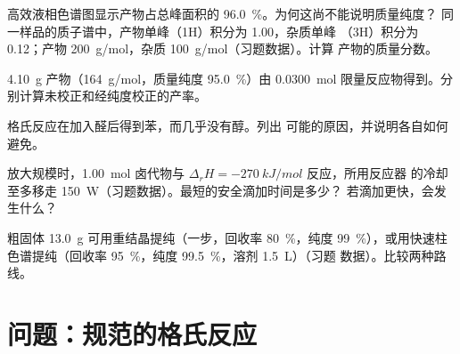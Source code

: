 \begin{exercise}[$\star\star$]\label{exo:b2:lab-techniques-2:8}
高效液相色谱图显示产物占总峰面积的 96.0~\%。为何这尚不能说明质量纯度？
同一样品的质子谱中，产物单峰（1H）积分为 1.00，杂质单峰
（3H）积分为 0.12；产物 \qty{200}{g/mol}，杂质 \qty{100}{g/mol}（习题数据）。计算
产物的质量分数。
\end{exercise}

\begin{exercise}[$\star\star$]\label{exo:b2:lab-techniques-2:9}
\qty{4.10}{g} 产物（\qty{164}{g/mol}，质量纯度 95.0~\%）由 \qty{0.0300}{mol}
限量反应物得到。分别计算未校正和经纯度校正的产率。
\end{exercise}

\begin{exercise}[$\star\star\star$]\label{exo:b2:lab-techniques-2:10}
格氏反应在加入醛后得到苯，而几乎没有醇。列出
可能的原因，并说明各自如何避免。
\end{exercise}

\begin{exercise}[$\star\star\star$]\label{exo:b2:lab-techniques-2:11}
放大规模时，\qty{1.00}{mol} 卤代物与 $\Delta_rH = \qty{-270}{kJ/mol}$ 反应，所用反应器
的冷却至多移走 \qty{150}{W}（习题数据）。最短的安全滴加时间是多少？
若滴加更快，会发生什么？
\end{exercise}

\begin{exercise}[$\star\star\star$]\label{exo:b2:lab-techniques-2:12}
粗固体 \qty{13.0}{g} 可用重结晶提纯（一步，回收率 80~\%，纯度
99~\%），或用快速柱色谱提纯（回收率 95~\%，纯度 99.5~\%，溶剂 \qty{1.5}{L}）（习题
数据）。比较两种路线。
\end{exercise}

\section{问题：规范的格氏反应}

